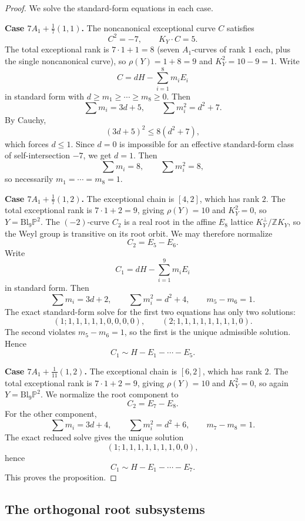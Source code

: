 \documentclass[11pt]{article}
\theoremstyle{definition}
\newcommand{\Pbb}{\mathbb P}
\newcommand{\Zbb}{\mathbb Z}
\newcommand{\Bl}{\mathrm{Bl}}
\begin{document}
\begin{proof}
We solve the standard-form equations in each case.

\medskip
\noindent
\textbf{Case $7A_1+\frac17(1,1)$.}
The noncanonical exceptional curve $C$ satisfies
\[
C^2=-7,\qquad K_Y\cdot C=5.
\]
The total exceptional rank is $7\cdot 1+1=8$ (seven $A_1$-curves of rank $1$ each, plus the single noncanonical curve), so $\rho(Y)=1+8=9$ and $K_Y^2=10-9=1$. Write
\[
C=dH-\sum_{i=1}^8m_iE_i
\]
in standard form with $d\ge m_1\ge \cdots\ge m_8\ge 0$. Then
\[
\sum m_i=3d+5,\qquad \sum m_i^2=d^2+7.
\]
By Cauchy,
\[
(3d+5)^2\le 8(d^2+7),
\]
which forces $d\le 1$. Since $d=0$ is impossible for an effective standard-form class of self-intersection $-7$, we get $d=1$. Then
\[
\sum m_i=8,\qquad \sum m_i^2=8,
\]
so necessarily $m_1=\cdots=m_8=1$.

\medskip
\noindent
\textbf{Case $7A_1+\frac17(1,2)$.}
The exceptional chain is $[4,2]$, which has rank $2$. The total exceptional rank is $7\cdot 1+2=9$, giving $\rho(Y)=10$ and $K_Y^2=0$, so $Y=\Bl_9\Pbb^2$. The $(-2)$-curve $C_2$ is a real root in the affine $E_8$ lattice $K_Y^{\perp}/\Zbb K_Y$, so the Weyl group is transitive on its root orbit. We may therefore normalize
\[
C_2=E_5-E_6.
\]
Write
\[
C_1=dH-\sum_{i=1}^9m_iE_i
\]
in standard form. Then
\[
\sum m_i=3d+2,\qquad \sum m_i^2=d^2+4,\qquad m_5-m_6=1.
\]
The exact standard-form solve for the first two equations has only two solutions:
\[
(1;1,1,1,1,1,0,0,0,0),\qquad (2;1,1,1,1,1,1,1,1,0).
\]
The second violates $m_5-m_6=1$, so the first is the unique admissible solution. Hence
\[
C_1\sim H-E_1-\cdots-E_5.
\]

\medskip
\noindent
\textbf{Case $7A_1+\frac1{11}(1,2)$.}
The exceptional chain is $[6,2]$, which has rank $2$. The total exceptional rank is $7\cdot 1+2=9$, giving $\rho(Y)=10$ and $K_Y^2=0$, so again $Y=\Bl_9\Pbb^2$. We normalize the root component to
\[
C_2=E_7-E_8.
\]
For the other component,
\[
\sum m_i=3d+4,\qquad \sum m_i^2=d^2+6,\qquad m_7-m_8=1.
\]
The exact reduced solve gives the unique solution
\[
(1;1,1,1,1,1,1,1,0,0),
\]
hence
\[
C_1\sim H-E_1-\cdots-E_7.
\]
This proves the proposition.
\end{proof}

\subsection{The orthogonal root subsystems}
\end{document}
